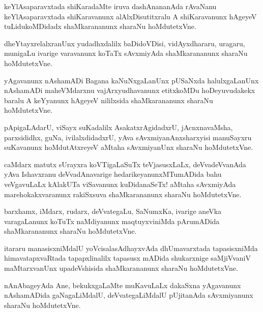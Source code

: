 \begin{mng}
keYlAsaparavxtada shiKaradaMte iruva dashAnananAda rAvaNanu keYlAsaparavxtada shiKaravanunx alAlxDisutitxralu A shiKaravanunx hAgeyeV tuLidukoMDidadx shaMkarananunx sharaNu hoMdutetxVne.
\end{mng}

\begin{mng}
dheYtayxrelalxranUnx yudadhxdalilx baDidoVDisi, vidAyxdhararu, uragaru, munigaLu ivarige varavanunx koTaTx sAvxmiyAda shaMkarananunx sharaNu hoMdutetxVne.
\end{mng}

\begin{mng}
yAgavanunx nAshamADi Bagana kaNuNxgaLanUnx pUSaNxda halulxgaLanUnx nAshamADi maheVMdarxnu vajArxyudhavanunx etitxkoMDu hoDeyuvudakekx baralu A keYyanunx hAgeyeV nililxsida shaMkarananunx sharaNu hoMdutetxVne.
\end{mng}

\begin{mng}
pApigaLAdarU, viSayx suKadalilx AsakatxrAgidadxrU, jAcnxnavaMsha, parxsididhx, guNa, ivilalxdidadxrU, yAva sAvxmiyanAnxsharxyisi manuSayxru suKavanunx hoMdutAtxreyeV aMtaha sAvxmiyanUnx sharaNu hoMdutetxVne.
\end{mng}

\begin{mng}
caMdarx matutx sUrayxra koVTigaLaSuTx teVjasusxLaLx, deVvadeVvanAda yAva Ishavxranu deVvadAnavarige hedarikeyanunxMTumADida bahu veVgavuLaLx kAlakUTa viSavanunx kuDidanaSeTx! aMtaha sAvxmiyAda marehokakxvaranunx rakiSxsuva shaMkarananunx sharaNu hoMdutetxVne.
\end{mng}

\begin{mng}
barxhamx, iMdarx, rudarx, deVvategaLu, SaNumxKa, ivarige aneVka varagaLanunx koTuTx naMdiyanunx maqtuyxviniMda pArumADida shaMkarananunx sharaNu hoMdutetxVne.
\end{mng}

\begin{mng}
itararu manasisxniMdalU yoVcisalasAdhayxvAda dhUmavarxtada tapasisxniMda himavatapxvaRtada tapapxlinalilx tapasusx mADida shukarxnige saMjiVvaniV maMtarxvanUnx upadeVshisida shaMkarananunx sharaNu hoMdutetxVne.
\end{mng}

\begin{mng}
nAnAbageyAda Ane, bekukxgaLaMte muKavuLaLx dakaSxna yAgavanunx nAshamADida gaNagaLiMdalU, deVvategaLiMdalU pUjitanAda sAvxmiyanunx sharaNu hoMdutetxVne.
\end{mng}


